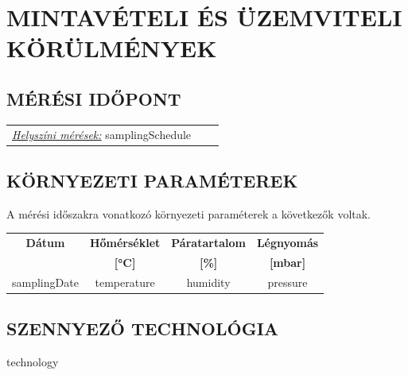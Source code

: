 \documentclass[a4paper,12pt]{article}
\renewcommand{\arraystretch}{0.5}
\begin{document}

	\newpage  %
	\section{MINTAVÉTELI ÉS ÜZEMVITELI KÖRÜLMÉNYEK}
	\subsection{MÉRÉSI IDŐPONT}
		\begin{adjustwidth}{1cm}{0cm}
			\begin{tabular}{ p{5.5cm} p{4cm} p{5cm}}
				\textit{\underline{Helyszíni mérések:}} {{samplingSchedule}}
			\end{tabular}
			
		\end{adjustwidth}
	
	
	

	\subsection{KÖRNYEZETI PARAMÉTEREK}
		\begin{adjustwidth}{1cm}{0cm}
			A mérési időszakra vonatkozó környezeti paraméterek a következők voltak. \\
			\begin{table}[h]
				\centering
				\renewcommand{\arraystretch}{1.5}
				\begin{tabular}{|c|c|c|c|}
					\hline
					\textbf{Dátum} & \multicolumn{1}{c|}{\textbf{Hőmérséklet}} & \multicolumn{1}{c|}{\textbf{Páratartalom}} & \multicolumn{1}{c|}{\textbf{Légnyomás}} \\
					& \textbf{[°C]} & \textbf{[\%]} & \textbf{[mbar]} \\
					\hline
					{{samplingDate}} & {{temperature}} & {{humidity}} & {{pressure}} \\
					\hline
				\end{tabular}\label{tab:table}
			\end{table}
			
			
		\end{adjustwidth}
	
	\subsection{SZENNYEZŐ TECHNOLÓGIA}
		\begin{adjustwidth}{1cm}{0cm}
			{{technology}}
		\end{adjustwidth}
	
\end{document}
